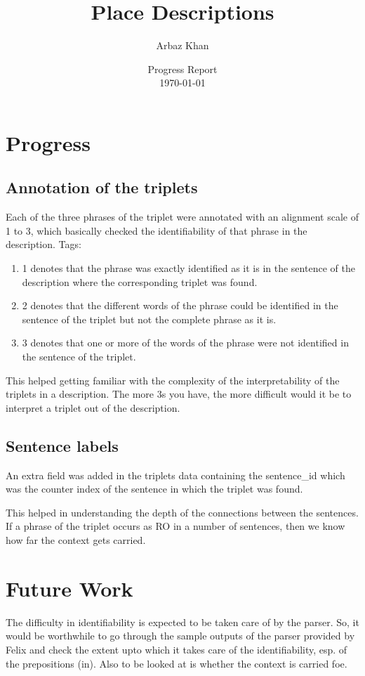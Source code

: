 \documentclass{article}
\title{Place Descriptions}
\author{Arbaz Khan}
\date{Progress Report \\ \today}
\begin{document}
\maketitle 

\section{Progress}

\subsection*{Annotation of the triplets}
  Each of the three phrases of the triplet were annotated with an
  alignment scale of 1 to 3, which basically checked the identifiability
  of that phrase in the description. Tags:

  \begin{enumerate}
  \item
    1 denotes that the phrase was exactly identified as it is in the
    sentence of the description where the corresponding triplet was
    found.
  \item
    2 denotes that the different words of the phrase could be
    identified in the sentence of the triplet but not the complete
    phrase as it is.
  \item
    3 denotes that one or more of the words of the phrase were not
    identified in the sentence of the triplet.
  \end{enumerate}


This helped getting familiar with the complexity of the interpretability
of the triplets in a description. The more 3s you have, the more
difficult would it be to interpret a triplet out of the description.

\subsection*{Sentence labels}
  An extra field was added in the triplets data containing the
  sentence\_id which was the counter index of the sentence in which the
  triplet was found.

  This helped in understanding the depth of the connections between the
  sentences. If a phrase of the triplet occurs as RO in a number of
  sentences, then we know how far the context gets carried.
\section{Future Work}
The difficulty in identifiability is expected to be taken care of by the
parser. So, it would be worthwhile to go through the sample outputs of
the parser provided by Felix and check the extent upto which it takes
care of the identifiability, esp. of the prepositions (in). Also to be
looked at is whether the context is carried foe.
\end{document}
